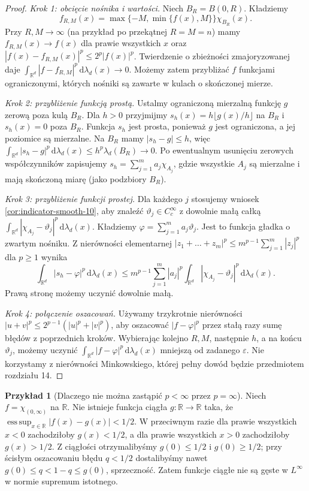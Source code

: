 \documentclass[11pt,a4paper,oneside]{book}
\numberwithin{equation}{chapter}
\theoremstyle{plain}
\theoremstyle{definition}
\newtheorem{przyklad}[twierdzenie]{Przykład}
\theoremstyle{remark}
\begin{document}
\begin{proof}
\textit{Krok 1: obcięcie nośnika i wartości.}
Niech $B_R=B(0,R)$. Kładziemy
\[
f_{R,M}(x)=\max\{-M,\min\{f(x),M\}\}\chi_{B_R}(x).
\]
Przy $R,M\to\infty$ (na przykład po przekątnej
$R=M=n$) mamy $f_{R,M}(x)\to f(x)$ dla prawie
wszystkich $x$ oraz
$|f(x)-f_{R,M}(x)|^p\le 2^p|f(x)|^p$.
Twierdzenie o zbieżności zmajoryzowanej daje
$\int_{\mathbb R^d}|f-f_{R,M}|^p\,\mathrm d\lambda_d(x)\to0$. Możemy zatem przybliżać
$f$ funkcjami ograniczonymi, których nośniki są
zawarte w kulach o skończonej mierze.

\textit{Krok 2: przybliżenie funkcją prostą.}
Ustalmy ograniczoną mierzalną funkcję $g$
zerową poza kulą $B_R$. Dla $h>0$ przyjmijmy
$s_h(x)=h\lfloor g(x)/h\rfloor$ na $B_R$ i
$s_h(x)=0$ poza $B_R$. Funkcja $s_h$ jest prosta,
ponieważ $g$ jest ograniczona, a jej poziomice
są mierzalne. Na $B_R$ mamy $|s_h-g|\le h$,
więc
$\int_{\mathbb R^d}|s_h-g|^p\,\mathrm d\lambda_d(x)
\le h^p\lambda_d(B_R)\to0$.
Po ewentualnym usunięciu zerowych współczynników
zapisujemy $s_h=\sum_{j=1}^m a_j\chi_{A_j}$,
gdzie wszystkie $A_j$ są mierzalne i mają skończoną
miarę (jako podzbiory $B_R$).

\textit{Krok 3: przybliżenie funkcji prostej.}
Dla każdego $j$ stosujemy wniosek
\ref{cor:indicator-smooth-10}, aby znaleźć
$\vartheta_j\in C_c^\infty$ z dowolnie małą całką
$\int_{\mathbb R^d}|\chi_{A_j}-\vartheta_j|^p\,\mathrm d\lambda_d(x)$.
Kładziemy $\varphi=\sum_{j=1}^m a_j\vartheta_j$.
Jest to funkcja gładka o zwartym nośniku.
Z nierówności elementarnej
$|z_1+\dots+z_m|^p\le m^{p-1}
\sum_{j=1}^m|z_j|^p$ dla $p\ge1$ wynika
\[
\int_{\mathbb R^d}|s_h-\varphi|^p
\,\mathrm d\lambda_d(x)
\le m^{p-1}\sum_{j=1}^m|a_j|^p
\int_{\mathbb R^d}|\chi_{A_j}-\vartheta_j|^p
\,\mathrm d\lambda_d(x).
\]
Prawą stronę możemy uczynić dowolnie małą.

\textit{Krok 4: połączenie oszacowań.}
Używamy trzykrotnie nierówności
$|u+v|^p\le 2^{p-1}(|u|^p+|v|^p)$,
aby oszacować $|f-\varphi|^p$ przez stałą
razy sumę błędów z poprzednich kroków.
Wybierając kolejno $R,M$, następnie $h$,
a na końcu $\vartheta_j$, możemy uczynić
$\int_{\mathbb R^d}|f-\varphi|^p\,\mathrm d\lambda_d(x)$ mniejszą od zadanego
$\varepsilon$. Nie korzystamy z nierówności
Minkowskiego, której pełny dowód będzie
przedmiotem rozdziału 14.
\end{proof}

\begin{przyklad}[Dlaczego nie można zastąpić $p<\infty$ przez $p=\infty$]
Niech $f=\chi_{(0,\infty)}$ na $\mathbb R$.
Nie istnieje funkcja ciągła $g:\mathbb R\to\mathbb R$
taka, że $\operatorname*{ess\,sup}_{x\in\mathbb R}
|f(x)-g(x)|<1/2$. W przeciwnym razie dla prawie
wszystkich $x<0$ zachodziłoby $g(x)<1/2$,
a dla prawie wszystkich $x>0$ zachodziłoby
$g(x)>1/2$. Z ciągłości otrzymalibyśmy
$g(0)\le1/2$ i $g(0)\ge1/2$; przy ścisłym
oszacowaniu błędu $q<1/2$ dostalibyśmy nawet
$g(0)\le q<1-q\le g(0)$, sprzeczność.
Zatem funkcje ciągłe nie są gęste w $L^\infty$
w normie supremum istotnego.
\end{przyklad}
\end{document}
